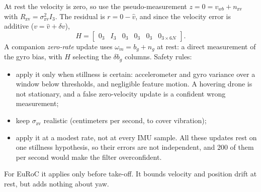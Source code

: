 \begin{solutions}
  \item At rest the velocity is zero, so use the pseudo-measurement $z = 0 = v_{wb} + n_{\mathrm{zv}}$ with $R_{\mathrm{zv}} = \sigma_{\mathrm{zv}}^2I_3$. The residual is $r = 0 - \hat v$, and since the velocity error is additive
        ($v = \hat v + \delta v$),
        \[
          H = \begin{bmatrix} 0_3 & I_3 & 0_3 & 0_3 & 0_3 & 0_{3\times6N} \end{bmatrix}.
        \]
        A companion \emph{zero-rate} update uses $\omega_m = b_g + n_g$ at rest: a direct measurement of the gyro bias, with $H$ selecting the $\delta b_g$ columns. Safety rules:
        \begin{itemize}
          \item apply it only when stillness is certain: accelerometer and gyro variance over a window below thresholds, and negligible feature motion.
                A hovering drone is not stationary, and a false zero-velocity update is a confident wrong measurement;
          \item keep $\sigma_{\mathrm{zv}}$ realistic (centimeters per second, to cover vibration);
          \item apply it at a modest rate, not at every IMU sample. All these updates rest on one stillness hypothesis, so their errors are not
                independent, and 200 of them per second would make the filter overconfident.
        \end{itemize}
        For EuRoC it applies only before take-off. It bounds velocity and position drift at rest, but adds nothing about yaw.


\end{solutions}
